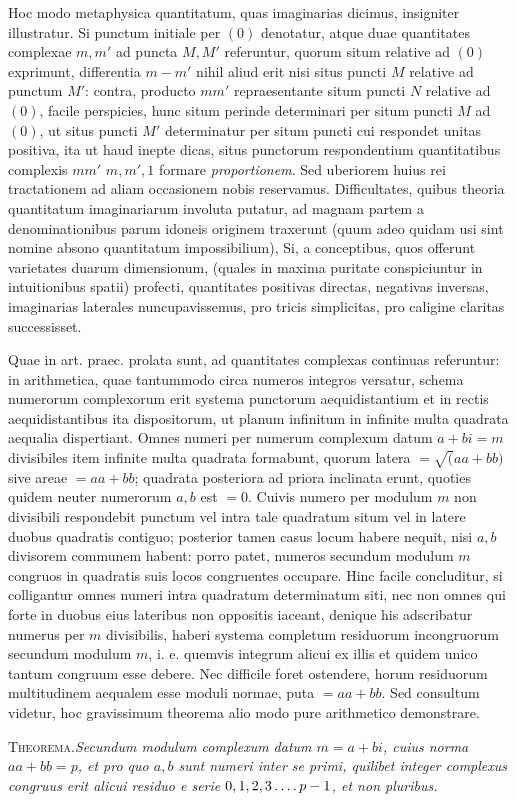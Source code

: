 Hoc modo metaphysica quantitatum, quas imaginarias dicimus, insigniter illustratur. Si punctum initiale per $(0)$ denotatur, atque duae quantitates complexae $m,m'$ ad puncta $M,M'$ referuntur, quorum situm relative ad $(0)$ exprimunt, differentia $m-m'$ nihil aliud erit nisi situs puncti $M$ relative ad punctum $M'$: contra, producto $mm'$ repraesentante situm puncti $N$ relative ad $(0)$, facile perspicies, hunc situm perinde determinari per situm puncti $M$ ad $(0)$, ut situs puncti $M'$ determinatur per situm puncti cui respondet unitas positiva, ita ut haud inepte dicas, situs punctorum respondentium quantitatibus complexis $mm'$
%
$m,m',1$ formare \emph{proportionem}. Sed uberiorem huius rei tractationem ad aliam occasionem nobis reservamus. Difficultates, quibus theoria quantitatum imaginariarum involuta putatur, ad magnam partem a denominationibus parum idoneis originem traxerunt (quum adeo quidam usi sint nomine absono quantitatum impossibilium), Si, a conceptibus, quos offerunt varietates duarum dimensionum, (quales in maxima puritate conspiciuntur in intuitionibus spatii) profecti, quantitates positivas directas, negativas inversas, imaginarias laterales nuncupavissemus, pro tricis simplicitas, pro caligine claritas successisset.

Quae in art. praec. prolata sunt, ad quantitates complexas continuas referuntur: in arithmetica, quae tantummodo circa numeros integros versatur, schema numerorum complexorum erit systema punctorum aequidistantium et in rectis aequidistantibus ita dispositorum, ut planum infinitum in infinite multa quadrata aequalia dispertiant. Omnes numeri per numerum complexum datum $a+bi=m$ divisibiles item infinite multa quadrata formabunt, quorum latera $=\surd(aa+bb)$ sive areae $=aa+bb$; quadrata posteriora ad priora inclinata erunt, quoties quidem neuter numerorum $a,b$ est $=0$. Cuivis numero per modulum $m$ non divisibili respondebit punctum vel intra tale quadratum situm vel in latere duobus quadratis contiguo; posterior tamen casus locum habere nequit, nisi $a,b$ divisorem communem habent: porro patet, numeros secundum modulum $m$ congruos in quadratis suis locos congruentes occupare. Hinc facile concluditur, si colligantur omnes numeri intra quadratum determinatum siti, nec non omnes qui forte in duobus eius lateribus non oppositis iaceant, denique his adscribatur numerus per $m$ divisibilis, haberi systema completum residuorum incongruorum secundum modulum $m$, i. e. quemvis integrum alicui ex illis et quidem unico tantum congruum esse debere. Nec difficile foret ostendere, horum residuorum multitudinem aequalem esse moduli normae, puta $=aa+bb$. Sed consultum videtur, hoc gravissimum theorema alio modo pure arithmetico demonstrare.

\textsc{Theorema.}\quad\emph{Secundum modulum complexum datum $m=a+bi$, cuius norma $aa+bb=p$, et pro quo $a,b$ sunt numeri inter se primi, quilibet integer complexus congruus erit alicui residuo e serie $0,1,2,3\mathinner{.\,.\,.\,.} p-1$, et non pluribus.}

